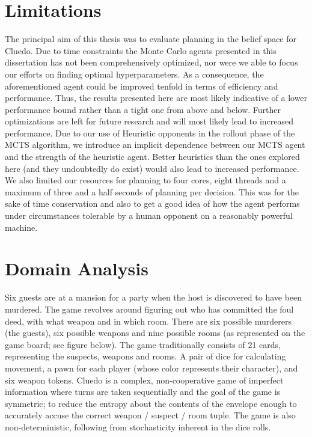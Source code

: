 \documentclass[msc, deptreport, ai, romanprepages]{infthesis}
\begin{document}
\section{Limitations}
The principal aim of this thesis was to evaluate planning in the belief space for Cluedo. Due to time constraints the Monte Carlo agents presented in this dissertation has not been comprehensively optimized, nor were we able to focus our efforts on finding optimal hyperparameters. As a consequence, the aforementioned agent could be improved tenfold in terms of efficiency and performance. Thus, the results presented here are most likely indicative of a lower performance bound rather than a tight one from above and below. Further optimizations are left for future research and will most likely lead to increased performance. Due to our use of Heuristic opponents in the rollout phase of the MCTS algorithm, we introduce an implicit dependence between our MCTS agent and the strength of the heuristic agent. Better heuristics than the ones explored here (and they undoubtedly do exist) would also lead to increased performance. We also limited our resources for planning to four cores, eight threads and a maximum of three and a half seconds of planning per decision. This was for the sake of time conservation and also to get a good idea of how the agent performs under circumstances tolerable by a human opponent on a reasonably powerful machine. 

\section{Domain Analysis}
Six guests are at a mansion for a party when the host is discovered to have been murdered. The game revolves around figuring out who has committed the foul deed, with what weapon and in which room. There are six possible murderers (the guests), six possible weapons and nine possible rooms (as represented on the game board; see figure below). The game traditionally consists of 21 cards, representing the suspects, weapons and rooms. A pair of dice for calculating movement, a pawn for each player (whose color represents their character), and six weapon tokens. Cluedo is a complex, non-cooperative game of imperfect information where turns are taken sequentially and the goal of the game is symmetric; to reduce the entropy about the contents of the envelope enough to accurately accuse the correct weapon / suspect / room tuple. The game is also non-deterministic, following from stochasticity inherent in the dice rolls.
\end{document}
